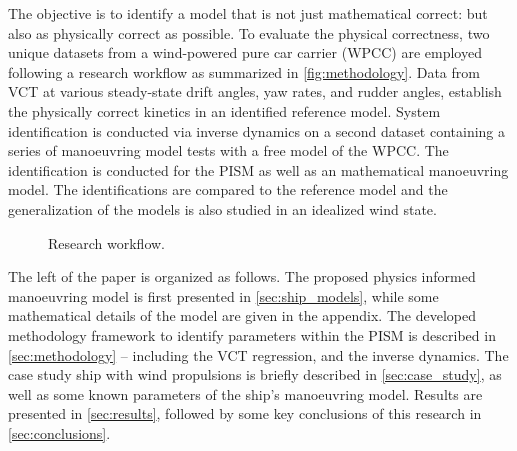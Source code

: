 The objective is to identify a model that is not just mathematical correct: but also as physically correct as possible.
To evaluate the physical correctness, two unique datasets from a wind-powered pure car carrier (WPCC) are employed following a research workflow as summarized in \autoref{fig:methodology}.
Data from VCT at various steady-state drift angles, yaw rates, and rudder angles, establish the physically correct kinetics in an identified reference model. 
System identification is conducted via inverse dynamics \citep{faber_inverse_2018} on a second dataset containing a series of manoeuvring model tests with a free model of the WPCC. The identification is conducted for the PISM as well as an mathematical manoeuvring model. The identifications are compared to the reference model and the generalization of the models is also studied in an idealized wind state.
%
\begin{figure}[h]
  \centering
  
  \caption{Research workflow.}
  \label{fig:methodology}
\end{figure}

The left of the paper is organized as follows. The proposed physics informed manoeuvring model is first presented in \autoref{sec:ship_models}, while some mathematical details of the model are given in the appendix. 
The developed methodology framework to identify parameters within the PISM is described in \autoref{sec:methodology} -- including the VCT regression, and the inverse dynamics. The case study ship with wind propulsions is briefly described in \autoref{sec:case_study}, as well as some known parameters of the ship's manoeuvring model. Results are presented in \autoref{sec:results}, followed by some key conclusions of this research in \autoref{sec:conclusions}.